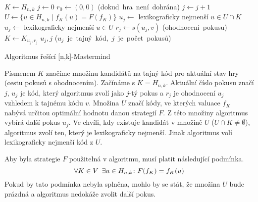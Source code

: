 






\begin{algorithm}[h!]
\begin{algorithmic}[1]  %
    \State $K \gets H_{n,k}$ 
    \State $j \gets 0$
    \State $r_0 \gets (0,0)$
     \hfill \mbox{(dokud hra není dohrána)}
        \State $j \gets j + 1$ 
	\State $U \gets \{u \in H_{n,k} \mid f_K(u) = F(f_K)\}$
            \State $u_j \gets$ lexikograficky nejmenší $u \in U \cap K$
	\Else
		\State $u_j \gets$ lexikograficky nejmenší $u \in U$
	\EndIf
        \State $r_j \gets s(u_j, v)$ \hfill \mbox{(ohodnocení pokusu)}
        \State $K \gets K_{u_j,r_j}$
    \EndWhile
    \State \Return $u_j, j$ \hfill \mbox{($u_j$ je tajný kód, $j$ je počet pokusů)}
\EndFunction
\end{algorithmic}
\caption{Algoritmus řešící [n,k]-Mastermind}
\label{alg-default}
\end{algorithm}

Písmenem $K$ značíme množinu kandidátů na tajný kód pro aktuální stav hry (cestu pokusů s ohodnocením). Začínáme s $K = H_{n,k}$. Aktuální číslo pokusu značí $j$, $u_j$ je kód, který algoritmus zvolí jako $j$-tý pokus a $r_j$ je ohodnocení $u_j$ vzhledem k tajnému kódu $v$. Množina $U$ značí kódy, ve kterých valuace $f_K$ nabývá určitou optimální hodnotu danou strategií $F$. Z této množiny algoritmus vybírá další pokus $u_j$. Ve chvíli, kdy existuje kandidát v množině $U$ ($U\cap K \neq \emptyset$), algoritmus zvolí ten, který je lexikograficky nejmenší. Jinak algoritmus volí lexikograficky nejmenší kód z $U$. 

Aby byla strategie $F$ použitelná v algoritmu, musí platit následující podmínka. 
\[\forall K \in V \hspace{5px} \exists u \in H_{n,k} \colon F(f_K) = f_K(u)\]
Pokud by tato podmínka nebyla splněna, mohlo by se stát, že množina $U$ bude prázdná a algoritmus nedokáže zvolit další pokus.


